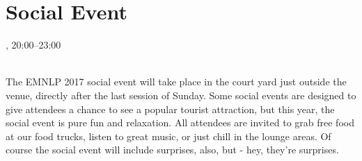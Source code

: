 \clearpage
\section{Social Event}
\setheaders{}{\daydateyear}

\begin{center}



\daydateyear, 20:00--23:00\vspace{1em}\\
\BanquetLoc\\
\end{center}

The  EMNLP 2017 social event will take place in the court yard just outside the venue, directly after the last session of Sunday. Some social events are designed to give attendees a chance to see a popular tourist attraction, but this year, the social event is pure fun and relaxation. All attendees are invited to grab free food at our food trucks, listen to great music, or just chill in the lounge areas. Of course the social event will include surprises, also, but - hey, they’re surprises. 
